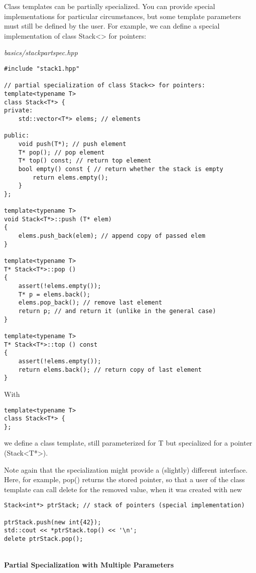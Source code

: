Class templates can be partially specialized. You can provide special implementations for particular circumstances, but some template parameters must still be defined by the user. For example, we can define a special implementation of class Stack<> for pointers:

\noindent
\textit{basics/stackpartspec.hpp}
\begin{lstlisting}[style=styleCXX]
#include "stack1.hpp"

// partial specialization of class Stack<> for pointers:
template<typename T>
class Stack<T*> {
private:
	std::vector<T*> elems; // elements
	
public:
	void push(T*); // push element
	T* pop(); // pop element
	T* top() const; // return top element
	bool empty() const { // return whether the stack is empty
		return elems.empty();
	}
};

template<typename T>
void Stack<T*>::push (T* elem)
{
	elems.push_back(elem); // append copy of passed elem
}

template<typename T>
T* Stack<T*>::pop ()
{
	assert(!elems.empty());
	T* p = elems.back();
	elems.pop_back(); // remove last element
	return p; // and return it (unlike in the general case)
}

template<typename T>
T* Stack<T*>::top () const
{
	assert(!elems.empty());
	return elems.back(); // return copy of last element
}
\end{lstlisting}

With

\begin{lstlisting}[style=styleCXX]
template<typename T>
class Stack<T*> {
};
\end{lstlisting}

we define a class template, still parameterized for T but specialized for a pointer (Stack<T*>).

Note again that the specialization might provide a (slightly) different interface. Here, for example, pop() returns the stored pointer, so that a user of the class template can call delete for the removed value, when it was created with new

\begin{lstlisting}[style=styleCXX]
Stack<int*> ptrStack; // stack of pointers (special implementation)

ptrStack.push(new int{42});
std::cout << *ptrStack.top() << '\n';
delete ptrStack.pop();
\end{lstlisting}

\hspace*{\fill} \\ %
\noindent
\textbf{Partial Specialization with Multiple Parameters}

